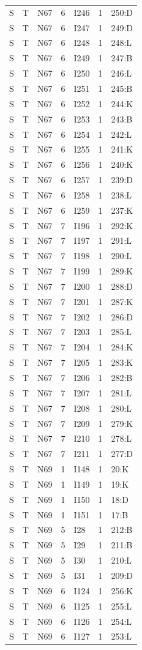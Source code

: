 {\begin{longtable}{lllrlrp{.35\linewidth}}
S & T & N67 & 6 & I246 & 1 & 250:D \\
S & T & N67 & 6 & I247 & 1 & 249:D \\
S & T & N67 & 6 & I248 & 1 & 248:L \\
S & T & N67 & 6 & I249 & 1 & 247:B \\
S & T & N67 & 6 & I250 & 1 & 246:L \\
S & T & N67 & 6 & I251 & 1 & 245:B \\
S & T & N67 & 6 & I252 & 1 & 244:K \\
S & T & N67 & 6 & I253 & 1 & 243:B \\
S & T & N67 & 6 & I254 & 1 & 242:L \\
S & T & N67 & 6 & I255 & 1 & 241:K \\
S & T & N67 & 6 & I256 & 1 & 240:K \\
S & T & N67 & 6 & I257 & 1 & 239:D \\
S & T & N67 & 6 & I258 & 1 & 238:L \\
S & T & N67 & 6 & I259 & 1 & 237:K \\
S & T & N67 & 7 & I196 & 1 & 292:K \\
S & T & N67 & 7 & I197 & 1 & 291:L \\
S & T & N67 & 7 & I198 & 1 & 290:L \\
S & T & N67 & 7 & I199 & 1 & 289:K \\
S & T & N67 & 7 & I200 & 1 & 288:D \\
S & T & N67 & 7 & I201 & 1 & 287:K \\
S & T & N67 & 7 & I202 & 1 & 286:D \\
S & T & N67 & 7 & I203 & 1 & 285:L \\
S & T & N67 & 7 & I204 & 1 & 284:K \\
S & T & N67 & 7 & I205 & 1 & 283:K \\
S & T & N67 & 7 & I206 & 1 & 282:B \\
S & T & N67 & 7 & I207 & 1 & 281:L \\
S & T & N67 & 7 & I208 & 1 & 280:L \\
S & T & N67 & 7 & I209 & 1 & 279:K \\
S & T & N67 & 7 & I210 & 1 & 278:L \\
S & T & N67 & 7 & I211 & 1 & 277:D \\
S & T & N69 & 1 & I148 & 1 & 20:K \\
S & T & N69 & 1 & I149 & 1 & 19:K \\
S & T & N69 & 1 & I150 & 1 & 18:D \\
S & T & N69 & 1 & I151 & 1 & 17:B \\
S & T & N69 & 5 & I28 & 1 & 212:B \\
S & T & N69 & 5 & I29 & 1 & 211:B \\
S & T & N69 & 5 & I30 & 1 & 210:L \\
S & T & N69 & 5 & I31 & 1 & 209:D \\
S & T & N69 & 6 & I124 & 1 & 256:K \\
S & T & N69 & 6 & I125 & 1 & 255:L \\
S & T & N69 & 6 & I126 & 1 & 254:L \\
S & T & N69 & 6 & I127 & 1 & 253:L \\
\end{longtable}}
